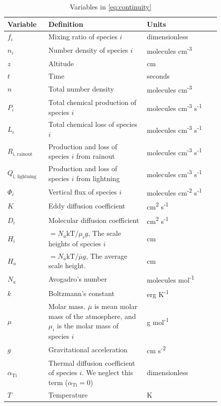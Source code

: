 \documentclass[9pt,twocolumn,twoside,lineno]{pnas-new}
\begin{document}
{\begin{table}
\centering
\begin{tabularx}{\linewidth}{p{0.15\linewidth} | p{0.4\linewidth} | p{0.3\linewidth}}
\hline \hline
Variable & Definition & Units \\
\hline
\(f_{i}\) & Mixing ratio of species \(i\) & dimensionless \\
\(n_{i}\) & Number density of species \(i\) & molecules
cm\textsuperscript{-3} \\
\(z\) & Altitude & cm \\
\(t\) & Time & seconds \\
\(n\) & Total number density & molecules
cm\textsuperscript{-3} \\
\(P_{i}\) & Total chemical production of species \(i\) & molecules
cm\textsuperscript{-3} s\textsuperscript{-1} \\
\(L_{i}\) & Total chemical loss of species \(i\) & molecules
cm\textsuperscript{-3} s\textsuperscript{-1} \\
\(R_{\text{i, rainout}}\) & Production and loss of species \(i\) from
rainout & molecules cm\textsuperscript{-3}
s\textsuperscript{-1} \\
\(Q_{\text{i, lightning}}\) & Production and loss of species \(i\)
from lightning & molecules cm\textsuperscript{-3}
s\textsuperscript{-1} \\
\(\Phi_{i}\) & Vertical flux of species \(i\) & molecules
cm\textsuperscript{-2} s\textsuperscript{-1} \\
\(K\) & Eddy diffusion coefficient & cm\textsuperscript{2}
s\textsuperscript{-1} \\
\(D_{i}\) & Molecular diffusion coefficient & cm\textsuperscript{2}
s\textsuperscript{-1} \\
\(H_{i}\) & \(= N_{a}\text{kT}\text{/}\mu_{i}g\), The scale heights of
species \(i\) & cm \\
\(H_{a}\) & \(= N_{a}\text{kT}\text{/}\overline{\mu}g\), The average
scale height. & cm \\
\(N_{a}\) & Avogadro's number & molecules
mol\textsuperscript{-1} \\
\(k\) & Boltzmann's constant & erg K\textsuperscript{-1} \\
\(\mu\) & Molar mass. \(\overline{\mu}\) is mean molar mass of the
atmosphere, and \(\mu_{i}\) is the molar mass of species \(i\) & g
mol\textsuperscript{-1} \\
\(g\) & Gravitational acceleration & cm
s\textsuperscript{-2} \\
\(\alpha_{\text{Ti}}\) & Thermal diffusion coefficient of species \(i\).
We neglect this term (\(\alpha_{\text{Ti}} = 0\)) &
dimensionless \\
\(T\) & Temperature & K \\
\end{tabularx}
\caption{Variables in \eqref{eq:continuity}}
\label{tab:variables}
\end{table}

}
\end{document}
